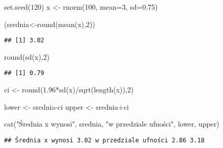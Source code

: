 \documentclass[
]{book}
\newenvironment{Shaded}{\begin{snugshade}}{\end{snugshade}}
\newcommand{\AttributeTok}[1]{\textcolor[rgb]{0.77,0.63,0.00}{#1}}
\newcommand{\DecValTok}[1]{\textcolor[rgb]{0.00,0.00,0.81}{#1}}
\newcommand{\FloatTok}[1]{\textcolor[rgb]{0.00,0.00,0.81}{#1}}
\newcommand{\FunctionTok}[1]{\textcolor[rgb]{0.00,0.00,0.00}{#1}}
\newcommand{\NormalTok}[1]{#1}
\newcommand{\OtherTok}[1]{\textcolor[rgb]{0.56,0.35,0.01}{#1}}
\newcommand{\SpecialCharTok}[1]{\textcolor[rgb]{0.00,0.00,0.00}{#1}}
\newcommand{\StringTok}[1]{\textcolor[rgb]{0.31,0.60,0.02}{#1}}
\begin{document}
\begin{Shaded}
\begin{Highlighting}[]
\FunctionTok{set.seed}\NormalTok{(}\DecValTok{120}\NormalTok{)}
\NormalTok{x }\OtherTok{\textless{}{-}} \FunctionTok{rnorm}\NormalTok{(}\DecValTok{100}\NormalTok{, }\AttributeTok{mean=}\DecValTok{3}\NormalTok{, }\AttributeTok{sd=}\FloatTok{0.75}\NormalTok{)}

\NormalTok{(srednia}\OtherTok{\textless{}{-}}\FunctionTok{round}\NormalTok{(}\FunctionTok{mean}\NormalTok{(x),}\DecValTok{2}\NormalTok{))}
\end{Highlighting}
\end{Shaded}

\begin{verbatim}
## [1] 3.02
\end{verbatim}

\begin{Shaded}
\begin{Highlighting}[]
\FunctionTok{round}\NormalTok{(}\FunctionTok{sd}\NormalTok{(x),}\DecValTok{2}\NormalTok{)}
\end{Highlighting}
\end{Shaded}

\begin{verbatim}
## [1] 0.79
\end{verbatim}

\begin{Shaded}
\begin{Highlighting}[]
\NormalTok{ci }\OtherTok{\textless{}{-}} \FunctionTok{round}\NormalTok{(}\FloatTok{1.96}\SpecialCharTok{*}\FunctionTok{sd}\NormalTok{(x)}\SpecialCharTok{/}\FunctionTok{sqrt}\NormalTok{(}\FunctionTok{length}\NormalTok{(x)),}\DecValTok{2}\NormalTok{)}

\NormalTok{lower }\OtherTok{\textless{}{-}}\NormalTok{ srednia}\SpecialCharTok{{-}}\NormalTok{ci}
\NormalTok{upper }\OtherTok{\textless{}{-}}\NormalTok{ srednia}\SpecialCharTok{+}\NormalTok{ci}

\FunctionTok{cat}\NormalTok{(}\StringTok{"Średnia x wynosi"}\NormalTok{, srednia, }\StringTok{"w przedziale ufności"}\NormalTok{, lower, upper)}
\end{Highlighting}
\end{Shaded}

\begin{verbatim}
## Średnia x wynosi 3.02 w przedziale ufności 2.86 3.18
\end{verbatim}
\end{document}
